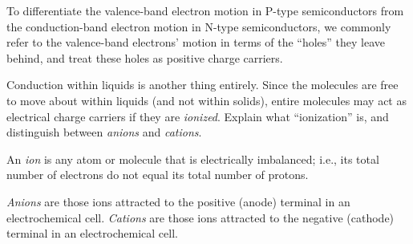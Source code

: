 To differentiate the valence-band electron motion in P-type semiconductors from the conduction-band electron motion in N-type semiconductors, we commonly refer to the valence-band electrons' motion in terms of the ``holes'' they leave behind, and treat these holes as positive charge carriers.

\vskip 10pt

Conduction within liquids is another thing entirely.  Since the molecules are free to move about within liquids (and not within solids), entire molecules may act as electrical charge carriers if they are {\it ionized}.  Explain what ``ionization'' is, and distinguish between {\it anions} and {\it cations}.







An {\it ion} is any atom or molecule that is electrically imbalanced; i.e., its total number of electrons do not equal its total number of protons.







{\it Anions} are those ions attracted to the positive (anode) terminal in an electrochemical cell.  {\it Cations} are those ions attracted to the negative (cathode) terminal in an electrochemical cell.




